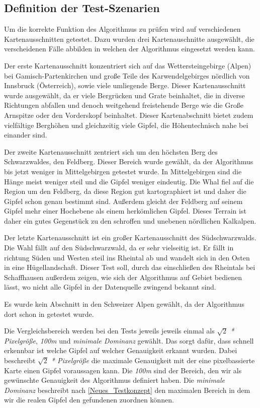 \subsection{Definition der Test-Szenarien}\label{subsec:definition_test_szenarien}
Um die korrekte Funktion des Algorithmus zu prüfen wird auf verschiedenen Kartenausschnitten getestet. Dazu wurden drei Kartenauschnitte ausgewählt, die verscheidenen Fälle abbilden in welchen der Algorithmus eingesetzt werden kann. 


Der erste Kartenausschnitt konzentriert sich auf das Wettersteingebirge (Alpen) bei Gamisch-Partenkirchen und große Teile des Karwendelgebirges nördlich von Innsbruck (Österreich), sowie viele umliegende Berge. Dieser Kartenausschnitt wurde ausgewählt, da er viele Bergrücken und Grate beinhaltet, die in diverse Richtungen abfallen und denoch weitgehend freistehende Berge wie die Große Arnspitze oder den Vorderskopf beinhaltet. Dieser Kartenabschnitt bietet zudem vielfältige Berghöhen und gleichzeitig viele Gipfel, die Höhentechnisch nahe bei einander sind.  


Der zweite Kartenausschnitt zentriert sich um den höchsten Berg des Schwarzwaldes, den Feldberg. Dieser Bereich wurde gewählt, da der Algorithmus bis jetzt weniger in Mittelgebirgen getestet wurde. In Mittelgebirgen sind die Hänge meist weniger steil und die Gipfel weniger eindeutig. Die Whal fiel auf die Region um den Feldberg, da diese Region gut kartographiert ist und daher die Gipfel schon genau bestimmt sind. Außerdem gleicht der Feldberg auf seinem Gipfel mehr einer Hochebene als einem herkömlichen Gipfel. Dieses Terrain ist daher ein gutes Gegenstück zu den schroffen und unebenen nördlichen Kalkalpen.  


Der letzte Kartenausschnitt ist ein großer Kartenausschnitt des Südschwarzwalds. Die Wahl fällt auf den Südschwarzwald, da er sehr vielseitig ist. Er fällt in richtung Süden und Westen steil ins Rheintal ab und wandelt sich in den Osten in eine Hügellandschaft. Dieser Test soll, durch das einschließen des Rheintals bei Schaffhausen außerdem zeigen, wie sich der Algorithmus auf Gebiet bedienen lässt, wo nicht alle Gipfel in der Datenquelle zwingend bekannt sind.

Es wurde kein Abschnitt in den Schweizer Alpen gewählt, da der Algorithmus dort schon in  getestet wurde.

Die Vergleichsbereich werden bei den Tests jeweils jeweils einmal als \textit{$\sqrt{2}$ * Pixelgröße}, \textit{100m} und \textit{minimale Dominanz} gewählt. Das sorgt dafür, dass schnell erkennbar ist welche Gipfel auf welcher Genauigkeit erkannt wurden. Dabei beschreibt \textit{$\sqrt{2}$ * Pixelgröße} die maximale Genauigkeit mit der eine pixelbassierte Karte einen Gipfel voraussagen kann. Die \textit{100m} sind der Bereich, den wir als gewünschte Genauigkeit des Algorithmus definiert haben. Die \textit{minimale Dominanz} beschreibt nach \ref{Neues_Testkonzept} den maximalen Bereich in dem wir die realen Gipfel den gefundenen zuordnen können.